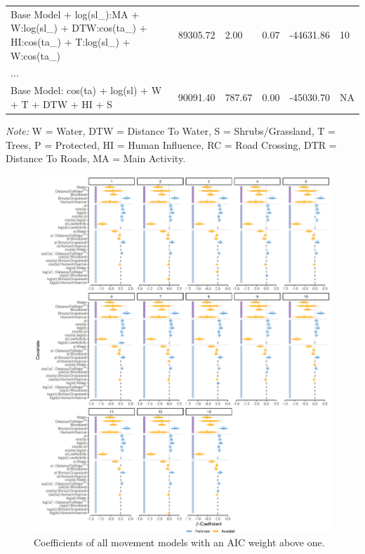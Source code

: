 \documentclass[abstract=off,10pt,a4paper,bibliography=totocnumbered]{article}
\begin{document}
\begin{table}[hbpt]
\begin{center}
{\begin{threeparttable}
\begin{tabular}{llllll}
          Base Model + log(sl\_):MA + W:log(sl\_) + DTW:cos(ta\_) + HI:cos(ta\_) + T:log(sl\_) + W:cos(ta\_) & 89305.72 & 2.00 & 0.07 & -44631.86 & 10\\
          \hdashline
          ...\\
          \hdashline
          Base Model: cos(ta) + log(sl) + W + T + DTW + HI + S & 90091.40 & 787.67 & 0.00 & -45030.70 & NA\\
         \bottomrule
       \end{tabular}
       \begin{tablenotes}
         \item \textit{Note:} W = Water, DTW = Distance To Water, S =
         Shrubs/Grassland, T = Trees, P = Protected, HI = Human Influence, RC =
         Road Crossing, DTR = Distance To Roads, MA = Main Activity.
       \end{tablenotes}
     \end{threeparttable}
    }
  \end{center}
\end{table}

\begin{figure}[htpb]
  \begin{center}
    \includegraphics[width = \textwidth]{99_MovementModelAICs.png}
    \caption{Coefficients of all movement models with an AIC weight above one.}
    \label{AllMovementModels}
  \end{center}
\end{figure}

\newpage
\begingroup
\singlespacing

\endgroup
\end{document}
